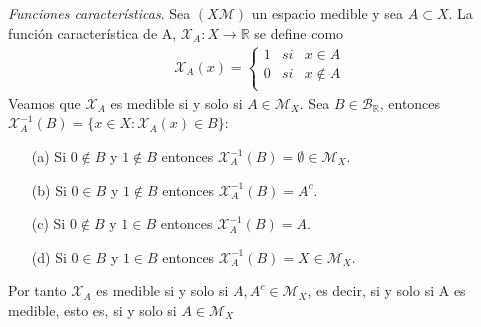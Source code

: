 \begin{ejemplo}
\end{ejemplo}
\textit{Funciones características}. Sea $(X \mathcal{M})$ un espacio medible y sea $A \subset X$. La función característica de A, $\mathcal{X}_A: X \longrightarrow \mathbb{R}$ se define como
\begin{align*}
    \mathcal{X}_A(x) =  \left\{ \begin{array}{lcc}
                                    1 & si & x \in A      \\
                                    0 & si & x \not \in A \\
                                \end{array}
    \right.
\end{align*}
Veamos que $\mathcal{X}_A$ es medible si y solo si $A \in \mathcal{M}_X$. Sea $B \in \mathcal{B}_{\mathbb{R}}$, entonces $\mathcal{X}_{A}^{-1}(B) = \{ x \in X : \mathcal{X}_A(x) \in B \}$:
\begin{enumerate}
    \item[(a)] Si $0 \not \in B$ y $1 \not \in B$ entonces $\mathcal{X}_{A}^{-1}(B) = \emptyset \in \mathcal{M}_X$.
    \item[(b)] Si $0 \in B$ y $1 \not \in B$ entonces $\mathcal{X}_{A}^{-1}(B) = A^c$.
    \item[(c)] Si $0 \not \in B$ y $1 \in B$ entonces $\mathcal{X}_{A}^{-1}(B) = A$.
    \item[(d)] Si $0 \in B$ y $1 \in B$ entonces $\mathcal{X}_{A}^{-1}(B) = X \in \mathcal{M}_X$.
\end{enumerate}
Por tanto $\mathcal{X}_A$ es medible si y solo si $A, A^c \in \mathcal{M}_X$, es decir, si y solo si A es medible, esto es, si y solo si $A \in \mathcal{M}_X$

